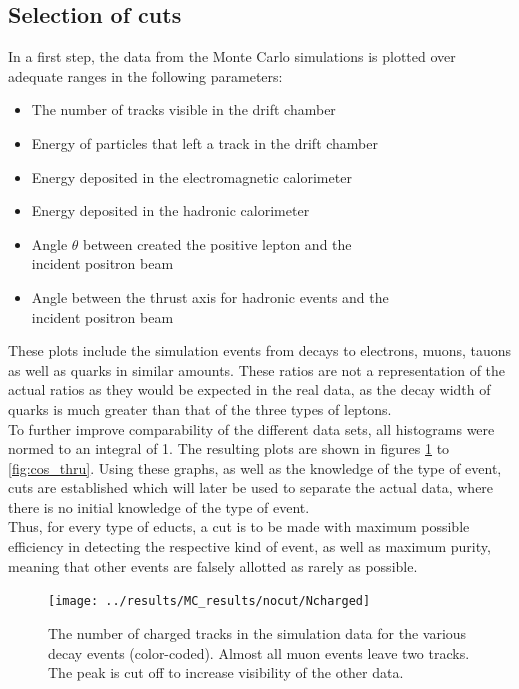 \subsection{Selection of cuts}
In a first step, the data from the Monte Carlo simulations is plotted over adequate ranges in the following parameters:
\begin{itemize}
	\item{The number of tracks visible in the drift chamber}
	\item{Energy of particles that left a track in the drift chamber}
	\item{Energy deposited in the electromagnetic calorimeter}
	\item{Energy deposited in the hadronic calorimeter}
	\item{Angle $\theta$ between created the positive lepton and the \\\makebox[3cm][l]{}incident positron beam}
	\item{Angle between the thrust axis for hadronic events and the \\\makebox[3cm][l]{}incident positron beam}
\end{itemize}
These plots include the simulation events from decays to electrons, muons, tauons as well as quarks in similar amounts. These ratios are not a representation of the actual ratios as they would be expected in the real data, as the decay width of quarks is much greater than that of the three types of leptons. \\
To further improve comparability of the different data sets, all histograms were normed to an integral of 1. The resulting plots are shown in figures \ref{fig:Ncharged} to \ref{fig:cos_thru}. Using these graphs, as well as the knowledge of the type of event, cuts are established which will later be used to separate the actual data, where there is no initial knowledge of the type of event.\\
Thus, for every type of educts, a cut is to be made with maximum possible efficiency in detecting the respective kind of event, as well as maximum purity, meaning that other events are falsely allotted as rarely as possible.

\newpage
\begin{figure}[H]
\centering
\texttt{[image: ../results/MC\_results/nocut/Ncharged]}
\caption[Ncharged in simulation data]{The number of charged tracks in the simulation data for the various decay events (color-coded). Almost all muon events leave two tracks. The peak is cut off to increase visibility of the other data.}
\label{fig:Ncharged}
\end{figure}

